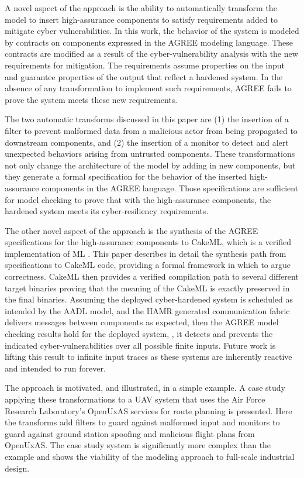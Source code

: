 A novel aspect of the approach is the ability to automatically transform the model to insert high-assurance components to satisfy requirements added to mitigate cyber vulnerabilities. In this work, the behavior of the system is modeled by contracts on components expressed in the AGREE modeling language. These contracts are modified as a result of the cyber-vulnerability analysis with the new requirements for mitigation.  The requirements assume properties on the input and guarantee properties of the output that reflect a hardened system. In the absence of any transformation to implement such requirements, AGREE fails to prove the system meets these new requirements.

The two automatic transforms discussed in this paper are (1) the insertion of a filter to prevent malformed data from a malicious actor from being propagated to downstream components, and (2) the insertion of a monitor to detect and alert unexpected behaviors arising from untrusted components. These transformations not only change the architecture of the model by adding in new components, but they generate a formal specification for the behavior of the inserted high-assurance components in the AGREE language. Those specifications are sufficient for model checking to prove that with the high-assurance components, the hardened system meets its cyber-resiliency requirements.

The other novel aspect of the approach is the synthesis of the AGREE specifications for the high-assurance components to CakeML, which is a verified implementation of ML \cite{cakeml}. This paper describes in detail the synthesis path from specifications to CakeML code, providing a formal framework in which to argue correctness. CakeML then provides a verified compilation path to several different target binaries proving that the meaning of the CakeML is exactly preserved in the final binaries. Assuming the deployed cyber-hardened system is scheduled as intended by the AADL model, and the HAMR generated communication fabric delivers messages between components as expected, then the AGREE model checking results hold for the deployed system, \ie, it detects and prevents the indicated cyber-vulnerabilities over all possible finite inputs. Future work is lifting this result to infinite input traces as these systems are inherently reactive and intended to run forever.

The approach is motivated, and illustrated, in a simple example. A case study applying these transformations to a UAV system that uses the Air Force Research Laboratory's OpenUxAS services for route planning is presented. Here the transforms add filters to guard against malformed input and monitors to guard against ground station spoofing and malicious flight plans from OpenUxAS. The case study system is significantly more complex than the example and shows the viability of the modeling approach to full-scale industrial design. 

